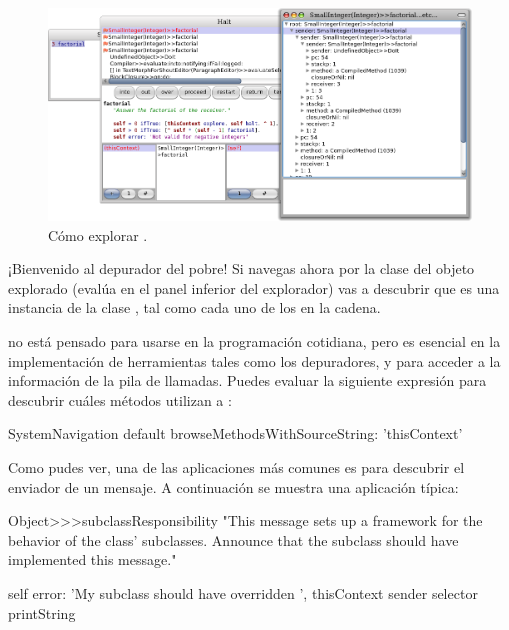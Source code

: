 \documentclass[a4paper,10pt,twoside]{book}
\begin{document}

\begin{figure}[ht]\centering
        \includegraphics[width=\linewidth]{exploringThisContext}
        \caption{ Cómo explorar
          .}
\end{figure}

¡Bienvenido al depurador del pobre!
Si navegas ahora por la clase del objeto explorado (evalúa  en el panel inferior del explorador) vas a descubrir que es
una instancia de la clase , tal como cada uno de
los  en la cadena.


 no está pensado para usarse en la programación
cotidiana, pero es esencial en la implementación de herramientas tales
como los depuradores, y para acceder a la información de la pila de
llamadas.  Puedes evaluar la siguiente expresión para descubrir cuáles
métodos utilizan a :

\begin{code}{}
SystemNavigation default browseMethodsWithSourceString: 'thisContext'
\end{code}

Como pudes ver, una de las aplicaciones más comunes es para descubrir
el enviador de un mensaje.  A continuación se muestra una aplicación
típica:
\begin{code}{}
Object>>>subclassResponsibility
        "This message sets up a framework for the behavior of the class' subclasses.
        Announce that the subclass should have implemented this message."

        self error: 'My subclass should have overridden ', thisContext sender selector printString
\end{code}
\end{document}
